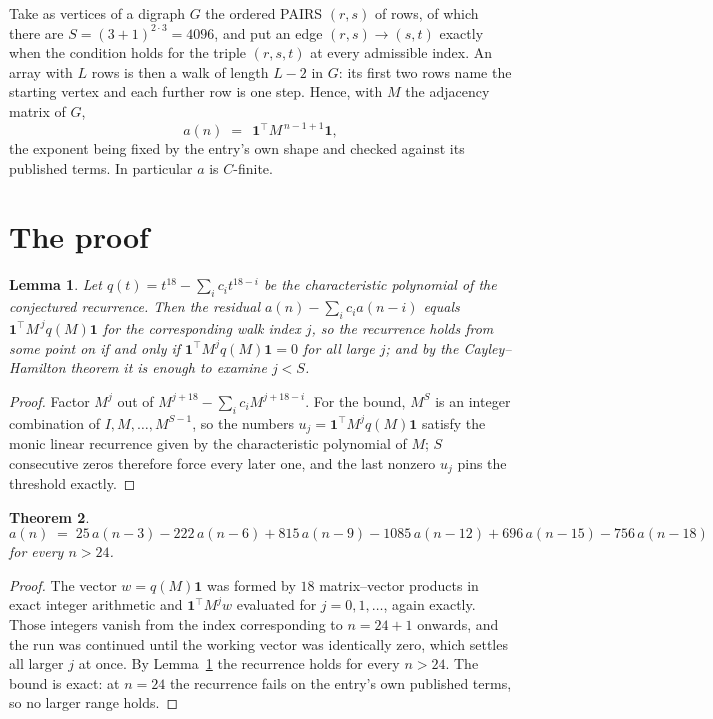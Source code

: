 \documentclass[11pt,a4paper]{article}
\theoremstyle{plain}
\newtheorem{theorem}{Theorem}
\newtheorem{lemma}[theorem]{Lemma}
\theoremstyle{definition}
\begin{document}
Take as vertices of a digraph $G$ the ordered PAIRS $(r,s)$ of rows, of which there are
$S=(3+1)^{2\cdot3}=4096$, and put an edge $(r,s)\to(s,t)$ exactly when the condition
holds for the triple $(r,s,t)$ at every admissible index. An array with $L$ rows is then a
walk of length $L-2$ in $G$: its first two rows name the starting vertex and each further
row is one step. Hence, with $M$ the adjacency matrix of $G$,
\[
a(n)\;=\;\,\mathbf{1}^{\!\top}M^{\,n-1+1}\mathbf{1},
\]
the exponent being fixed by the entry's own shape and checked against its published terms.
In particular $a$ is $C$-finite.

\section{The proof}

\begin{lemma}\label{lem:crit}
Let $q(t)=t^{18}-\sum_i c_it^{18-i}$ be the characteristic polynomial of the
conjectured recurrence. Then the residual $a(n)-\sum_ic_ia(n-i)$ equals
$\mathbf{1}^{\!\top}M^{\,j}q(M)\mathbf{1}$ for the corresponding walk index
$j$, so the recurrence holds from some point on if and only if
$\mathbf{1}^{\!\top}M^{j}q(M)\mathbf{1}=0$ for all large $j$; and by the
Cayley--Hamilton theorem it is enough to examine $j<S$.
\end{lemma}

\begin{proof}
Factor $M^{j}$ out of $M^{j+18}-\sum_ic_iM^{j+18-i}$. For the bound, $M^{S}$
is an integer combination of $I,M,\dots,M^{S-1}$, so the numbers
$u_j=\mathbf{1}^{\!\top}M^{j}q(M)\mathbf{1}$ satisfy the monic linear recurrence given by
the characteristic polynomial of $M$; $S$ consecutive zeros therefore force every later one,
and the last nonzero $u_j$ pins the threshold exactly.
\end{proof}

\begin{theorem}
\[
a(n)\;=\;25\,a(n-3) - 222\,a(n-6) + 815\,a(n-9) - 1085\,a(n-12) + 696\,a(n-15) - 756\,a(n-18)
\]
for every $n>24$.
\end{theorem}

\begin{proof}
The vector $w=q(M)\mathbf{1}$ was formed by $18$ matrix--vector products in exact
integer arithmetic and $\mathbf{1}^{\!\top}M^{j}w$ evaluated for $j=0,1,\dots$, again
exactly. Those integers vanish from the index corresponding to $n=24+1$ onwards, and the
run was continued until the working vector was identically zero, which settles all larger $j$
at once. By Lemma~\ref{lem:crit} the recurrence holds for every $n>24$. The bound is exact: at $n=24$ the recurrence fails on the entry's own published terms, so no larger range holds.
\end{proof}
\end{document}
